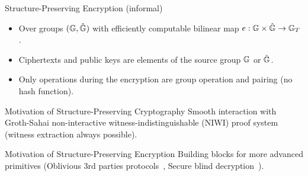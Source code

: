 \begin{frame}
  \begin{block}{Structure-Preserving Encryption (informal)}
    \pause
    \begin{itemize}
    \item Over groups $(\mathbb{G}, \hat{\mathbb{G}})$ with efficiently computable bilinear map $e: \mathbb{G} \times \hat{\mathbb{G}} \to \mathbb{G}_T$.
      \pause
    \item Ciphertexts and public keys are elements of the source group $\mathbb{G}$ or $\hat{\mathbb{G}}$.
      \pause
    \item Only operations during the encryption are group operation and pairing (\eg no hash function).
    \end{itemize}
  \end{block}

  \pause
  
  \begin{block}{Motivation of Structure-Preserving Cryptography}
    Smooth interaction with Groth-Sahai non-interactive witness-indistinguishable (NIWI) proof system (witness extraction always possible).
  \end{block}

  \pause
  
  \begin{block}{Motivation of Structure-Preserving Encryption}
    Building blocks for more advanced primitives (\eg Oblivious 3rd parties protocols~\cite{DBLP:conf/dim/CamenischGH08}, Secure blind decryption~\cite{DBLP:conf/pkc/Green11}).
  \end{block}
\end{frame}



